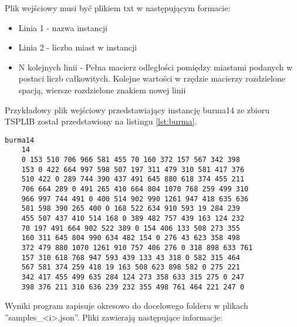 Plik wejściowy musi być plikiem txt w następującym formacie:
\begin{itemize}
    \item Linia 1 - nazwa instancji
    \item Linia 2 - liczba miast w instancji
    \item N kolejnych linii - Pełna macierz odległości pomiędzy miastami podanych w postaci liczb całkowitych.
          Kolejne wartości w rzędzie macierzy rozdzielone spacją, wiersze rozdzielone znakiem nowej linii
\end{itemize}


Przykładowy plik wejściowy przedstawiający instancję burma14 ze zbioru TSPLIB został przedstawiony na listingu
\ref{lst:burma}.

\begin{lstlisting}[caption={Instancja burma14 w formacie akceptowanym przez program}, label=lst:burma]
    burma14
    14
    0 153 510 706 966 581 455 70 160 372 157 567 342 398 
    153 0 422 664 997 598 507 197 311 479 310 581 417 376 
    510 422 0 289 744 390 437 491 645 880 618 374 455 211 
    706 664 289 0 491 265 410 664 804 1070 768 259 499 310 
    966 997 744 491 0 400 514 902 990 1261 947 418 635 636 
    581 598 390 265 400 0 168 522 634 910 593 19 284 239 
    455 507 437 410 514 168 0 389 482 757 439 163 124 232 
    70 197 491 664 902 522 389 0 154 406 133 508 273 355 
    160 311 645 804 990 634 482 154 0 276 43 623 358 498 
    372 479 880 1070 1261 910 757 406 276 0 318 898 633 761 
    157 310 618 768 947 593 439 133 43 318 0 582 315 464 
    567 581 374 259 418 19 163 508 623 898 582 0 275 221 
    342 417 455 499 635 284 124 273 358 633 315 275 0 247 
    398 376 211 310 636 239 232 355 498 761 464 221 247 0     
\end{lstlisting}

Wyniki program zapisuje okresowo do docelowego folderu w plikach ''samples\_<i>.json''.
Pliki zawierają następujące informacje:

